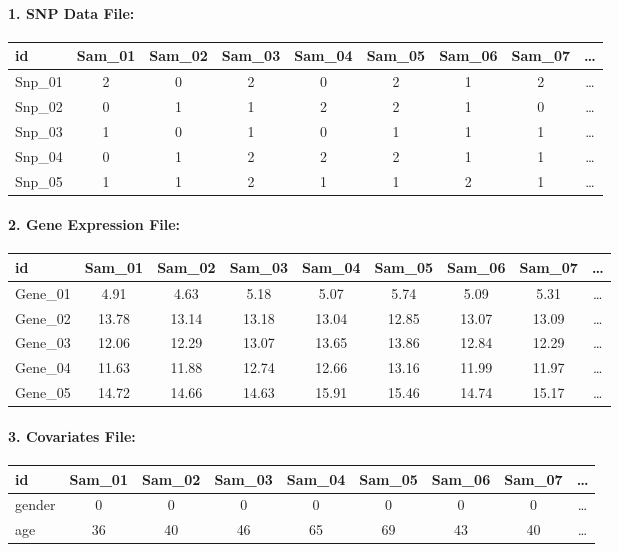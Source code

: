 \documentclass[12pt,a4paper]{article}
\begin{document}
\paragraph{1. SNP Data File:}
\small
\begin{longtable}{l|*{8}{c}}
\hline
id & Sam\_01 & Sam\_02 & Sam\_03 & Sam\_04 & Sam\_05 & Sam\_06 & Sam\_07 & \ldots \\
\hline
Snp\_01 & 2 & 0 & 2 & 0 & 2 & 1 & 2 & \ldots \\
Snp\_02 & 0 & 1 & 1 & 2 & 2 & 1 & 0 & \ldots \\
Snp\_03 & 1 & 0 & 1 & 0 & 1 & 1 & 1 & \ldots \\
Snp\_04 & 0 & 1 & 2 & 2 & 2 & 1 & 1 & \ldots \\
Snp\_05 & 1 & 1 & 2 & 1 & 1 & 2 & 1 & \ldots \\
\hline
\end{longtable}
\normalsize

\paragraph{2. Gene Expression File:}
\small
\begin{longtable}{l|*{8}{c}}
\hline
id & Sam\_01 & Sam\_02 & Sam\_03 & Sam\_04 & Sam\_05 & Sam\_06 & Sam\_07 & \ldots \\
\hline
Gene\_01 & 4.91 & 4.63 & 5.18 & 5.07 & 5.74 & 5.09 & 5.31 & \ldots \\
Gene\_02 & 13.78 & 13.14 & 13.18 & 13.04 & 12.85 & 13.07 & 13.09 & \ldots \\
Gene\_03 & 12.06 & 12.29 & 13.07 & 13.65 & 13.86 & 12.84 & 12.29 & \ldots \\
Gene\_04 & 11.63 & 11.88 & 12.74 & 12.66 & 13.16 & 11.99 & 11.97 & \ldots \\
Gene\_05 & 14.72 & 14.66 & 14.63 & 15.91 & 15.46 & 14.74 & 15.17 & \ldots \\
\hline
\end{longtable}
\normalsize

\paragraph{3. Covariates File:}
\small
\begin{longtable}{l|*{8}{c}}
\hline
id & Sam\_01 & Sam\_02 & Sam\_03 & Sam\_04 & Sam\_05 & Sam\_06 & Sam\_07 & \ldots \\
\hline
gender & 0 & 0 & 0 & 0 & 0 & 0 & 0 & \ldots \\
age & 36 & 40 & 46 & 65 & 69 & 43 & 40 & \ldots \\
\hline
\end{longtable}
\normalsize
\end{document}

